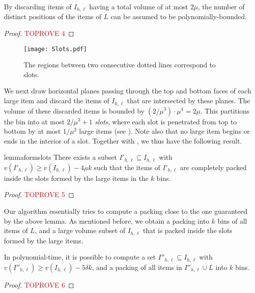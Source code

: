 \documentclass[a4paper,UKenglish,cleveref, autoref, thm-restate]{lipics-v2021}
\begin{document}
\begin{lemma}
\label{lem:discretepos}
    By discarding items of $I_{h,\ell}$ having a total volume of at most $2\mu$, the number of distinct positions of the items of $L$ can be assumed to be polynomially-bounded. 
\end{lemma}
\begin{proof}\textcolor{red}{TOPROVE 4}\end{proof}

\begin{figure}
    \centering
    \texttt{[image: Slots.pdf]}
    \caption{The regions between two consecutive dotted lines correspond to slots.}
    \label{fig:slots}
\end{figure}

We next draw horizontal planes passing through the top and bottom faces of each large item and discard the items of $I_{h,\ell}$ that are intersected by these planes. The volume of these discarded items is bounded by $(2/\mu^3)\cdot \mu^4 = 2\mu$. This partitions the bin into at most $2/\mu^3 +1$ \emph{slots}, where each slot is penetrated from top to bottom by at most $1/\mu^2$ large items (see ). Note also that no large item begins or ends in the interior of a slot. Together with , we thus have the following result.

\begin{restatable}{lemma}{formslots}
\label{lem:formslots}
    There exists a subset $I'_{h,\ell}\subseteq I_{h,\ell}$ with $v(I'_{h,\ell})\ge v(I_{h,\ell})-4\mu k$ such that the items of $I'_{h,\ell}$ are completely packed inside the slots formed by the large items in the $k$ bins.
\end{restatable}
\begin{proof}\textcolor{red}{TOPROVE 5}\end{proof}

Our algorithm essentially tries to compute a packing close to the one guaranteed by the above lemma. As mentioned before, we obtain a packing into $k$ bins of all items of $L$, and a large volume subset of $I_{h,\ell}$ that is packed inside the slots formed by the large items. 

\begin{lemma}
\label{lem:GAP}
    In polynomial-time, it is possible to compute a set $I''_{h,\ell} \subseteq I_{h,\ell}$ with $v(I''_{h,\ell})\ge v(I_{h,\ell})-5\delta k$, and a packing of all items in $I''_{h,\ell}\cup L$ into $k$ bins.
\end{lemma}
\begin{proof}\textcolor{red}{TOPROVE 6}\end{proof}
\end{document}
